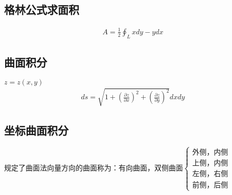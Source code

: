 	\subsection{格林公式求面积}
	\begin{align}
		A=\frac{1}{2}\oint_{L}xdy-ydx \label{Green's_formula_2}
	\end{align}
\subsection{曲面积分}
$z=z(x,y)$
\begin{align}
	ds=\sqrt{1+\left(\frac{\partial z}{\partial x}\right)^2+\left(\frac{\partial z}{\partial y}\right)^2}dxdy
\end{align}
\subsection{坐标曲面积分}
规定了曲面法向量方向的曲面称为：有向曲面，双侧曲面$\begin{cases}
	\mbox{外侧，内侧}\\
	\mbox{上侧，内侧}\\
	\mbox{左侧，右侧}\\
	\mbox{前侧，后侧}
\end{cases}$
	
	
	
	
	
	
	
	
	
	
	
	
	
	
	
	
	
